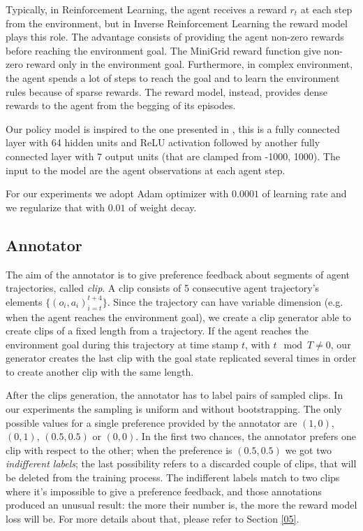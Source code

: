 Typically, in Reinforcement Learning, the agent receives a reward $r_t$ at each step from the environment, but in Inverse Reinforcement Learning the reward model plays this role. The advantage consists of providing the agent non-zero rewards before reaching the environment goal. The MiniGrid reward function give non-zero reward only in the environment goal.
Furthermore, in complex environment, the agent spends a lot of steps to reach the goal and to learn the environment rules because of sparse rewards. The reward model, instead, provides dense rewards to the agent from the begging of its episodes. 

Our policy model is inspired to the one presented in \cite{karpathy}, this is a fully connected layer with 64 hidden units and ReLU activation followed by another fully connected layer with 7 output units (that are clamped from -1000, 1000). The input to the model are the agent observations at each agent step. 

For our experiments we adopt Adam optimizer with $0.0001$ of learning rate and we regularize that with $0.01$ of weight decay. 

\subsection{Annotator}
The aim of the annotator is to give preference feedback about segments of agent trajectories, called \textit{clip}. A clip consists of 5 consecutive agent trajectory's elements $\{(o_i, a_i)_{i=t}^{t+4}\}$. Since the trajectory can have variable dimension (e.g. when the agent reaches the environment goal), we create a clip generator able to create clips of a fixed length from a trajectory. If the agent reaches the environment goal during this trajectory at time stamp $t$, with $t \mod T \not= 0$, our generator creates the last clip with the goal state replicated several times in order to create another clip with the same length.

After the clips generation, the annotator has to label pairs of sampled clips. In our experiments the sampling is uniform and without bootstrapping. The only possible values for a single preference provided by the annotator are $(1,0)$, $(0,1)$, $(0.5,0.5)$ or $(0,0)$. In the first two chances, the annotator prefers one clip with respect to the other; when the preference is $(0.5,0.5)$ we got two \textit{indifferent labels}; the last possibility refers to a discarded couple of clips, that will be deleted from the training process. The indifferent labels match to two clips where it's impossible to give a preference feedback, and those annotations produced an unusual result: the more their number is, the more the reward model loss will be. For more details about that, please refer to Section \ref{05}.

